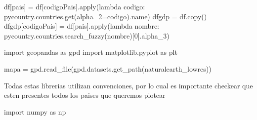 \documentclass[
  letterpaper,
  DIV=11,
  numbers=noendperiod]{scrartcl}
\newenvironment{Shaded}{\begin{snugshade}}{\end{snugshade}}
\newcommand{\BuiltInTok}[1]{\textcolor[rgb]{0.00,0.23,0.31}{#1}}
\newcommand{\DecValTok}[1]{\textcolor[rgb]{0.68,0.00,0.00}{#1}}
\newcommand{\ImportTok}[1]{\textcolor[rgb]{0.00,0.46,0.62}{#1}}
\newcommand{\KeywordTok}[1]{\textcolor[rgb]{0.00,0.23,0.31}{#1}}
\newcommand{\NormalTok}[1]{\textcolor[rgb]{0.00,0.23,0.31}{#1}}
\newcommand{\OperatorTok}[1]{\textcolor[rgb]{0.37,0.37,0.37}{#1}}
\newcommand{\StringTok}[1]{\textcolor[rgb]{0.13,0.47,0.30}{#1}}
\begin{document}
\begin{Shaded}
\begin{Highlighting}[]
\NormalTok{df[}\StringTok{\textquotesingle{}pais\textquotesingle{}}\NormalTok{] }\OperatorTok{=}\NormalTok{ df[}\StringTok{\textquotesingle{}codigoPais\textquotesingle{}}\NormalTok{].}\BuiltInTok{apply}\NormalTok{(}\KeywordTok{lambda}\NormalTok{ codigo: pycountry.countries.get(alpha\_2}\OperatorTok{=}\NormalTok{codigo).name)}
\NormalTok{dfgdp }\OperatorTok{=}\NormalTok{ df.copy()}
\NormalTok{dfgdp[}\StringTok{\textquotesingle{}codigoPais\textquotesingle{}}\NormalTok{] }\OperatorTok{=}\NormalTok{ df[}\StringTok{\textquotesingle{}pais\textquotesingle{}}\NormalTok{].}\BuiltInTok{apply}\NormalTok{(}\KeywordTok{lambda}\NormalTok{ nombre: pycountry.countries.search\_fuzzy(nombre)[}\DecValTok{0}\NormalTok{].alpha\_3)}
\end{Highlighting}
\end{Shaded}

\begin{Shaded}
\begin{Highlighting}[]
\ImportTok{import}\NormalTok{ geopandas }\ImportTok{as}\NormalTok{ gpd}
\ImportTok{import}\NormalTok{ matplotlib.pyplot }\ImportTok{as}\NormalTok{ plt}

\NormalTok{mapa }\OperatorTok{=}\NormalTok{ gpd.read\_file(gpd.datasets.get\_path(}\StringTok{\textquotesingle{}naturalearth\_lowres\textquotesingle{}}\NormalTok{))}
\end{Highlighting}
\end{Shaded}

\begin{tcolorbox}[enhanced jigsaw, opacitybacktitle=0.6, titlerule=0mm, left=2mm, bottomtitle=1mm, arc=.35mm, bottomrule=.15mm, toptitle=1mm, leftrule=.75mm, breakable, rightrule=.15mm, colback=white, colbacktitle=quarto-callout-note-color!10!white, colframe=quarto-callout-note-color-frame, coltitle=black, opacityback=0, toprule=.15mm, title=\textcolor{quarto-callout-note-color}{\faInfo}\hspace{0.5em}{Note}]

Todas estas librerias utilizan convenciones, por lo cual es importante
checkear que esten presentes todos los paises que queremos plotear

\end{tcolorbox}

\begin{Shaded}
\begin{Highlighting}[]
\ImportTok{import}\NormalTok{ numpy }\ImportTok{as}\NormalTok{ np}
\end{Highlighting}
\end{Shaded}
\end{document}
